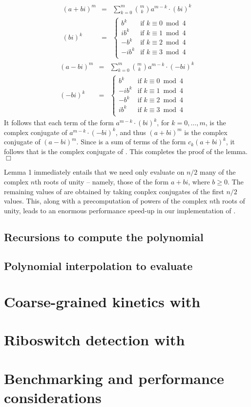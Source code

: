 \begin{eqnarray*}
(a+bi)^m &=& \sum_{k=0}^m {m \choose k} a^{m-k}\cdot  (bi)^k \\
(bi)^k  &=& \left\{
\begin{array}{ll}
b^k &\mbox{if $k \equiv 0 \bmod 4$}\\
i b^k &\mbox{if $k \equiv 1 \bmod 4$}\\
-b^k &\mbox{if $k \equiv 2 \bmod 4$}\\
-i b^k &\mbox{if $k \equiv 3 \bmod 4$}\\
\end{array} \right.
\end{eqnarray*}
\begin{eqnarray*}
(a-bi)^m &=& \sum_{k=0}^m {m \choose k} a^{m-k} \cdot (-bi)^k \\
(-bi)^k &=& \left\{
\begin{array}{ll}
b^k &\mbox{if $k \equiv 0 \bmod 4$}\\
-ib^k &\mbox{if $k \equiv 1 \bmod 4$}\\
-b^k &\mbox{if $k \equiv 2 \bmod 4$}\\
ib^k &\mbox{if $k \equiv 3 \bmod 4$}\\
\end{array} \right.
\end{eqnarray*}
It follows that each term of the form
$a^{m-k} \cdot (bi)^k$, for $k=0,\ldots,m$, is the complex conjugate of
$a^{m-k} \cdot (-bi)^k$, and thus $(a+bi)^m$ is the complex conjugate of
$(a-bi)^m$. Since  is a sum of terms of the form $c_k (a+bi)^k$,
it follows that  is the complex conjugate of .
This completes the proof of the lemma. \hfill  $\Box$
\medskip

Lemma 1 immediately entails that we need only evaluate \emZ{} on $n/2$
many of the complex $n$th roots of unity -- namely, those of the form
$a+bi$, where $b \geq 0$. The remaining values of \emZ{} are obtained by
taking conplex conjugates of the first $n/2$ values. This, along with a
precomputation of powers of the complex $n$th roots of unity, leads to an
enormous performance speed-up in our implementation of \fftbor.

\subsection{Recursions to compute the polynomial
\texorpdfstring{}{}}
\label{subsec:fftbor:polynomial}

\subsection{Polynomial interpolation to evaluate
\texorpdfstring{}{}}
\label{subsec:fftbor:fft}

\section{Coarse-grained kinetics with \fftbor}
\label{sec:fftbor:kinetics}

\section{Riboswitch detection with \fftbor}
\label{sec:fftbor:rb}

\section{Benchmarking and performance considerations}
\label{sec:fftbor:benchmarking}
